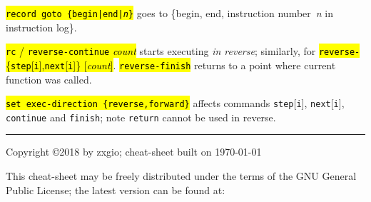 \documentclass[a4paper,landscape]{article}
\begin{document}
\begin{multicols*}{3}
\hl{\texttt{record goto \{\texttt{begin}|\texttt{end}|\textit{n}\}}} goes to \{begin, end, instruction number~\textit{n} in instruction log\}.

\hl{\texttt{rc} / \texttt{reverse-continue} \textit{count}} starts executing \emph{in reverse}; similarly, for \hl{\texttt{reverse-}\{\texttt{step}[\texttt{i}],\texttt{next}[\texttt{i}]\} [\textit{count}]}.
\hl{\texttt{reverse-finish}} returns to a point where current function was called.

\hl{\texttt{set exec-direction \{reverse,forward\}}}
affects commands \texttt{step}[\texttt{i}], \texttt{next}[\texttt{i}], \texttt{continue}
and \texttt{finish}; note \texttt{return} cannot be used in reverse.

\rule{1.0\linewidth}{0.25pt}
\scriptsize
Copyright \copyright 2018 by zxgio; cheat-sheet built on \today

This cheat-sheet may be freely distributed under the terms of the GNU
General Public License; the latest version can be found at: \\
\end{multicols*}
\end{document}
